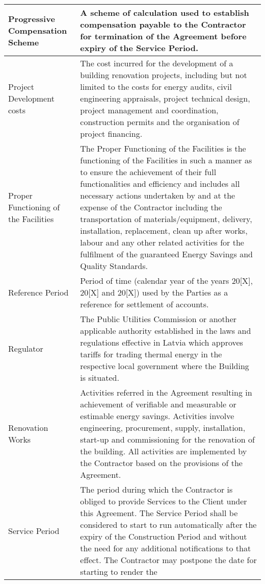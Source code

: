\begin{center}
\begin{longtabu}{|X|X[3]|}
	Progressive Compensation Scheme & A scheme of calculation used to
					  establish compensation payable to the Contractor for termination of the
					  Agreement before expiry of the Service Period. \\ \hline{}
	Project Development costs & The cost incurred for the development of a
				    building renovation projects, including but not limited to the costs for energy
				    audits, civil engineering appraisals, project technical design, project
				    management and coordination, construction permits and the organisation of
				    project financing. \\ \hline{}
	Proper Functioning of the Facilities & The Proper Functioning of the
					       Facilities is the functioning of the Facilities in such a manner as to ensure
					       the achievement of their full functionalities and efficiency and includes all
					       necessary actions undertaken by and at the expense of the Contractor including
					       the transportation of materials/equipment, delivery, installation, replacement,
					       clean up after works, labour and any other related activities for the
					       fulfilment of the guaranteed Energy Savings and Quality Standards. \\ \hline{}
	Reference Period & Period of time (calendar year of the years 20[X],
			   20[X] and 20[X]) used by the Parties as a reference for settlement of accounts. \\ \hline{}
	Regulator & The Public Utilities Commission or another applicable
		    authority established in the laws and regulations effective in Latvia which
		    approves tariffs for trading thermal energy in the respective local government
		    where the Building is situated. \\ \hline{}
	Renovation Works & Activities referred in the Agreement resulting in
			   achievement of verifiable and measurable or estimable energy savings.
			   Activities involve engineering, procurement, supply, installation, start{-}up and
			   commissioning for the renovation of the building. All activities are
			   implemented by the Contractor based on the provisions of the Agreement. \\ \hline{}
	Service Period & The period during which the Contractor is obliged to
			 provide Services to the Client under this Agreement. The Service Period shall
			 be considered to start to run automatically after the expiry of the
			 Construction Period and without the need for any additional notifications to
			 that effect. The Contractor may postpone the date for starting to render the

\end{longtabu}
\end{center}
